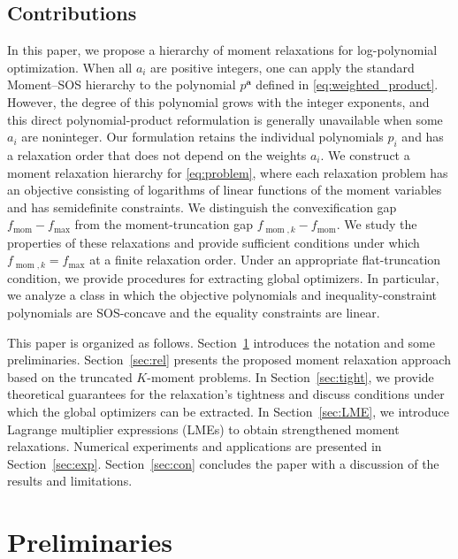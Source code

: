 \documentclass[pdflatex,sn-mathphys-num]{sn-jnl}%
\newcommand{\rd}[1]{{\color{red}#1}}
\newcommand{\vect}[1]{\boldsymbol{#1}}
\theoremstyle{thmstyleone}%
\theoremstyle{thmstyletwo}%
\theoremstyle{thmstylethree}%
\begin{document}
\subsection{Contributions}
In this paper, we propose a hierarchy of moment relaxations 
for log-polynomial optimization.
\rd{When all $a_i$ are positive integers, one can apply the standard
Moment--SOS hierarchy to the polynomial $p^{\vect{a}}$ defined in
\eqref{eq:weighted_product}. However, the degree of this polynomial
grows with the integer exponents, and this direct polynomial-product
reformulation is generally unavailable when some $a_i$ are
noninteger.}
\rd{Our formulation retains the individual polynomials $p_i$ and has
a relaxation order that does not depend on the weights $a_i$.}
\rd{We construct a moment relaxation hierarchy for
\eqref{eq:problem}, where each relaxation problem has an objective
consisting of logarithms of linear functions of the moment variables
and has semidefinite constraints.}
\rd{We distinguish the convexification gap
$f_{\operatorname{mom}}-f_{\max}$ from the moment-truncation gap $f_{\operatorname{mom},k}-f_{\operatorname{mom}}$.}
\rd{We study the properties of these relaxations and provide
sufficient conditions under which
$f_{\operatorname{mom},k}=f_{\max}$ at a finite relaxation order.}
\rd{Under an appropriate flat-truncation condition, we provide
procedures for extracting global optimizers.}
\rd{In particular, we analyze a class in which the objective
polynomials and inequality-constraint polynomials are SOS-concave and
the equality constraints are linear.}



This paper is organized as follows.
Section~\ref{sec:Pre} introduces the notation and some preliminaries.
Section~\ref{sec:rel} presents the proposed moment relaxation 
approach based on the truncated $K$-moment problems.
In Section~\ref{sec:tight}, we provide theoretical guarantees for 
the relaxation's tightness and discuss conditions under 
which the global optimizers can be extracted.
In Section~\ref{sec:LME}, we introduce Lagrange multiplier expressions (LMEs)
to obtain strengthened moment relaxations.
Numerical experiments and applications are presented in Section~\ref{sec:exp}.
Section~\ref{sec:con} concludes the paper with a discussion of the
results and limitations.



\section{Preliminaries}\label{sec:Pre}
\end{document}
